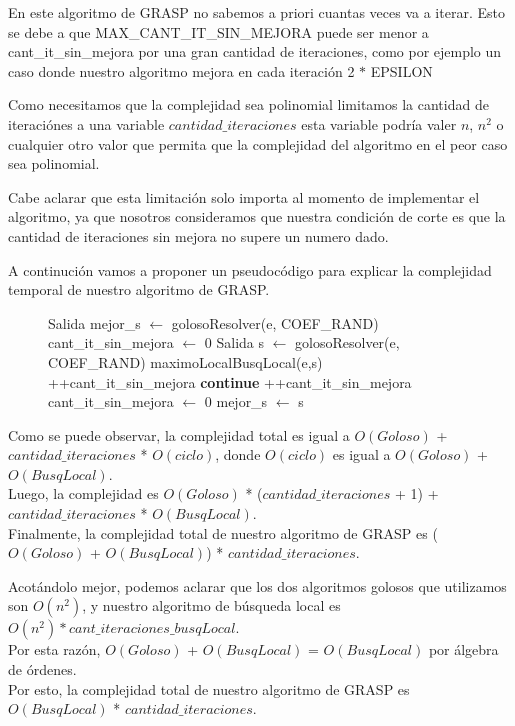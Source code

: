 En este algoritmo de GRASP no sabemos a priori cuantas veces va a iterar. Esto se debe a que MAX\_CANT\_IT\_SIN\_MEJORA puede ser menor a cant\_it\_sin\_mejora por una gran cantidad de iteraciones, como por ejemplo un caso donde nuestro algoritmo mejora en cada iteración 2 $*$ EPSILON

Como necesitamos que la complejidad sea polinomial limitamos la cantidad de iteraciónes a una variable $cantidad\_iteraciones$ esta variable podría valer $n$, $n^2$ o cualquier otro valor que permita que la complejidad del algoritmo en el peor caso sea polinomial.

Cabe aclarar que esta limitación solo importa al momento de implementar el algoritmo, ya que nosotros consideramos que nuestra condición de corte es que la cantidad de iteraciones sin mejora no supere un numero dado.

A continución vamos a proponer un pseudocódigo para explicar la complejidad temporal de nuestro algoritmo de GRASP.

\begin{center}
 \begin{figure}[H]
  \begin{pseudo}
    \State Salida mejor\_s $\leftarrow$ golosoResolver(e, COEF\_RAND) 
    \State cant\_it\_sin\_mejora $\leftarrow$ 0 
     
      \State Salida s $\leftarrow$ golosoResolver(e, COEF\_RAND) 
      \State maximoLocalBusqLocal(e,s) 
       
	\State++cant\_it\_sin\_mejora 
	\State \textbf{continue}
      \EndIf
       
	\State ++cant\_it\_sin\_mejora 
      \Else
	\State cant\_it\_sin\_mejora $\leftarrow$ 0 
      \EndIf
       
	\State mejor\_s $\leftarrow$ s 
      \EndIf
    \EndWhile
    \EndProcedure
  \end{pseudo}
 \end{figure}
\end{center}

Como se puede observar, la complejidad total es igual a $O(Goloso)$ + $cantidad\_iteraciones$ * $O(ciclo)$, donde $O(ciclo)$ es igual a  $O(Goloso)$ + $O(BusqLocal)$.\\
Luego, la complejidad es $O(Goloso)$ * ($cantidad\_iteraciones$ + 1) + $cantidad\_iteraciones$ * $O(BusqLocal)$.\\
Finalmente, la complejidad total de nuestro algoritmo de GRASP es ($O(Goloso)$ + $O(BusqLocal)$) * $cantidad\_iteraciones$.

Acotándolo mejor, podemos aclarar que los dos algoritmos golosos que utilizamos son $O(n^2)$, y nuestro algoritmo de búsqueda local es $O(n^2) * cant\_iteraciones\_busqLocal$.\\
Por esta razón, $O(Goloso)$ + $O(BusqLocal)$ = $O(BusqLocal)$ por álgebra de órdenes.\\
Por esto, la complejidad total de nuestro algoritmo de GRASP es $O(BusqLocal)$ * $cantidad\_iteraciones$.